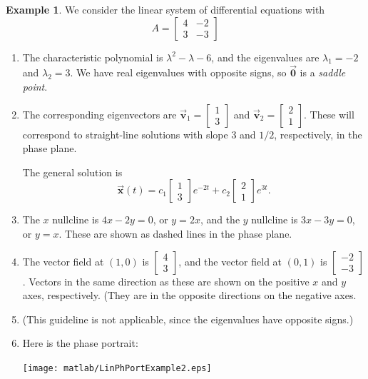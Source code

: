 \documentclass[reqno]{immbook}
\newcommand{\BV}{\vec{\textbf{v}}}
\newcommand{\BX}{\vec{\textbf{x}}}
\newcommand{\BZero}{\vec{\textbf{0}}}  %
\numberwithin{equation}{chapter}
\numberwithin{question}{section}
\numberwithin{theorem}{chapter}
\numberwithin{figure}{chapter}
\theoremstyle{definition}
\newtheorem{example}{Example}[section]
\begin{document}
\newpage

\begin{example}
We consider the linear system of differential equations
with
\[
   A = \begin{bmatrix}
            4 & -2 \\ 3 & -3
       \end{bmatrix}
\]
\begin{enumerate}
\item
The characteristic polynomial is
$\lambda^2 -\lambda -6$, and the eigenvalues are
$\lambda_1 = -2$ and $\lambda_2 = 3$.
We have real eigenvalues with opposite signs, so
$\BZero$ is a \emph{saddle point}.
\item
The corresponding eigenvectors are
$\BV_1 = \begin{bmatrix} 1 \\ 3 \end{bmatrix}$
and
$\BV_2 = \begin{bmatrix} 2 \\ 1 \end{bmatrix}$.
These will correspond to straight-line solutions with
slope $3$ and $1/2$, respectively, in the phase plane.

The general solution is
\begin{equation}
\BX(t) = c_1 \begin{bmatrix} 1 \\ 3 \end{bmatrix} e^{-2t}
   + c_2 \begin{bmatrix} 2 \\ 1 \end{bmatrix} e^{3t}.
\end{equation}
\item
The $x$ nullcline is $4x-2y=0$, or $y = 2x$, and the
$y$ nullcline is $3x-3y=0$, or $y=x$.  These are shown
as dashed lines in the phase plane.
\item
The vector field at $(1,0)$ is $\begin{bmatrix} 4 \\ 3 \end{bmatrix}$,
and the vector field at $(0,1)$
is $\begin{bmatrix} -2 \\ -3 \end{bmatrix}$.  Vectors in the
same direction as these are shown on the positive $x$ and $y$ axes,
respectively.
(They are in the opposite directions on the negative axes.
\item
(This guideline is not applicable, since the eigenvalues
have opposite signs.)
\item
Here is the phase portrait:

\noindent
\centerline{\texttt{[image: matlab/LinPhPortExample2.eps]}}
\end{enumerate}
\end{example}
\end{document}
